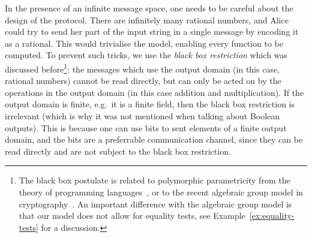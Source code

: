 In the presence of an infinite message space, one needs to be careful about the design of the protocol. There are infinitely many rational numbers, and Alice could try to send her part of the input string in a single message by encoding it as a rational. This would trivialise the model, enabling every function to be computed. To prevent such tricks, we use the \emph{black box restriction} which was discussed before\footnote{The black box postulate is related to  polymorphic parametricity from the theory of programming languages~\cite[Section 7]{reynolds1983types}, or to the recent algebraic group model in cryptography~\cite[Section 1.2]{fuchsbauer2018algebraic}. An important difference with the algebraic group model is that our model does not allow for equality tests, see Example~\ref{ex:equality-tests} for a discussion.}: the messages which use the output domain (in this case, rational numbers) cannot be read directly, but can only be acted on by the operations in the output domain (in this case addition and multiplication).
 If the output domain is finite, e.g.~it is a finite field, then the black box restriction is irrelevant (which is why it was not mentioned when talking about Boolean outputs). This is because one can use bits to sent elements of a finite output domain, and the bits are a preferrable communication channel, since they can be read directly and are not subject to the black box restriction. 

